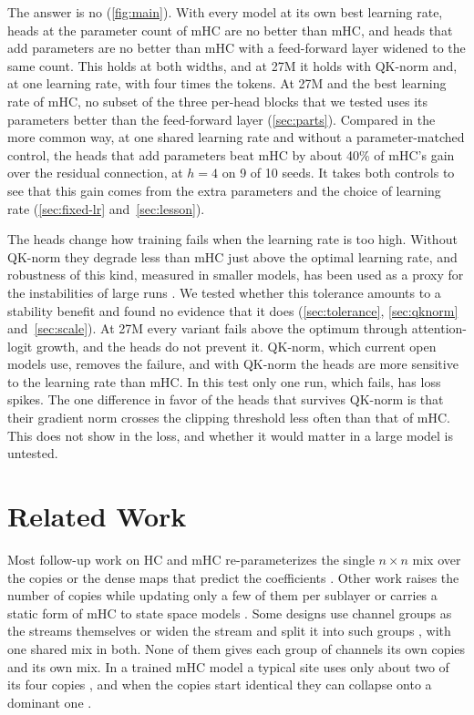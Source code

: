 \documentclass[11pt, a4paper]{article}
\begin{document}
The answer is no (\cref{fig:main}). With every model at its own best learning rate, heads at the parameter count of mHC are no
better than mHC, and heads that add parameters are no better than mHC with a feed-forward layer widened to the same count. This holds at both widths, and at 27M it holds with QK-norm and, at one learning rate, with four times the tokens. At 27M and
the best learning rate of mHC,
no subset of the three per-head blocks that we tested uses its parameters better than the feed-forward layer (\cref{sec:parts}). Compared in the
more common way, at one shared learning rate and without a parameter-matched control, the heads that add parameters beat mHC by about 40\% of mHC's gain over
the residual connection, at $h = 4$ on 9 of 10 seeds. It takes both controls to see that this gain comes from the extra parameters and the choice of
learning rate (\cref{sec:fixed-lr} and~\cref{sec:lesson}).

The heads change how training fails when the learning rate is too high. Without QK-norm they degrade less than mHC just above the optimal
learning rate, and robustness of this kind, measured in smaller models, has been used as a proxy for the instabilities of large
runs \citep{wortsman2023proxies, qiu2026qwen38next}. We tested whether this tolerance amounts to a stability benefit and found no evidence that
it does (\cref{sec:tolerance}, \cref{sec:qknorm} and~\cref{sec:scale}). At 27M every variant fails above the optimum through
attention-logit growth, and the heads do not prevent it. QK-norm, which current open models use, removes the failure, and with
QK-norm the heads are more sensitive to the learning rate than mHC. In this test only one run, which fails, has loss
spikes. The one difference in favor of the heads that survives QK-norm is that their gradient norm crosses the clipping
threshold less often than that of mHC. This does not show in the loss, and whether it would matter in a large model is untested.

\section{Related Work}
\label{sec:related}

Most follow-up work on HC and mHC re-parameterizes the single $n \times n$ mix over the copies \citep{yang2026mhclite,
zhou2026kromhc, dandachi2026gomhc, lyubinin2026tbpmhc, liu2026shc, guo2026ohc} or the dense maps that predict the coefficients
\citep{gu2026temper}. Other work raises the number of copies while updating only a few of them per sublayer \citep{zhang2026xhc}
or carries a static form of mHC to state space models \citep{mutlu2026mhcssm}. Some designs use channel groups as the streams
themselves \citep{zhu2025fracconnections} or widen the stream and split it into such groups \citep{seed2025vwn}, with one shared
mix in both. None of them gives each group of channels its own copies and its own mix. In a trained mHC model a typical site uses
only about two of its four copies \citep{zhao2026howdoesmhc}, and when the copies start identical they can collapse onto a
dominant one \citep{alimaskina2026streamcollapse}.
\end{document}
